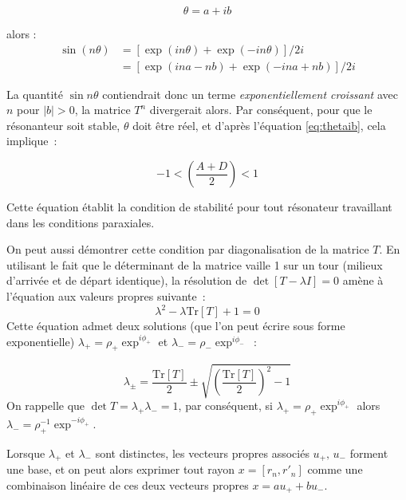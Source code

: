 \documentclass[a4paper]{book}
\newcommand{\Tr}[1]{\mathrm{Tr}\left[{#1}\right]}
\begin{document}
\begin{equation}
\label{eq:thetaib}
    \theta = a + ib
\end{equation}

alors : 
\begin{align*}
     \sin (n\theta) &= \left[\exp(in\theta)+\exp(-in\theta)\right]/2i \\
     &=\left[\exp(ina - nb)+\exp(-ina + nb)\right]/2i 
\end{align*}

La quantité $\sin n\theta$ contiendrait donc un terme \textit{exponentiellement croissant} avec $n$ pour $|b|>0$, la matrice $T^n$ divergerait alors. Par conséquent, pour que le résonanteur soit stable, $\theta$ doit être réel, et d'après l'équation \ref{eq:thetaib}, cela implique~:

\begin{equation}
\label{eq:stab}
 -1<\left(\frac{A+D}{2}\right)<1
\end{equation}

Cette équation établit la condition de stabilité pour tout résonateur travaillant dans les conditions paraxiales. 


On peut aussi démontrer cette condition par diagonalisation de la matrice $T$. 
En utilisant le fait que le déterminant de la matrice vaille 1 sur un tour (milieux d'arrivée et de départ identique), la résolution de $\det\left[T-\lambda I\right] = 0$ amène à l'équation aux valeurs propres suivante~:
\begin{equation}
\lambda^2- \lambda \Tr{T}+1 = 0
\end{equation}
Cette équation admet deux solutions (que l'on peut écrire sous forme exponentielle) $\lambda_+ = \rho_+\exp^{i\phi_+}$ et  $\lambda_- = \rho_-\exp^{i\phi_-}$~: 

\begin{equation}
\label{eq:eigenval}
    \lambda_\pm=
    \frac{\Tr{T}}{2}
    \pm
    \sqrt{
    \left(
    \frac{\Tr{T}}
    {2}
    \right)^2-1
    }
\end{equation}
On rappelle que  $\det{T}=\lambda_{+}\lambda_{-} = 1$, par conséquent, si $\lambda_+ = \rho_+\exp^{i\phi_+}$ alors $\lambda_- = \rho_+^{-1}\exp^{-i\phi_+}$. 

Lorsque $\lambda_{+}$ et $\lambda_{-}$ sont distinctes, les vecteurs propres associés $u_{+},\,u_{-}$ forment une base, et on peut alors exprimer tout rayon $x = \left[r_n, r'_n\right]$ comme une combinaison linéaire de ces deux vecteurs propres $x = au_{+}+bu_{-}$. 
\end{document}
